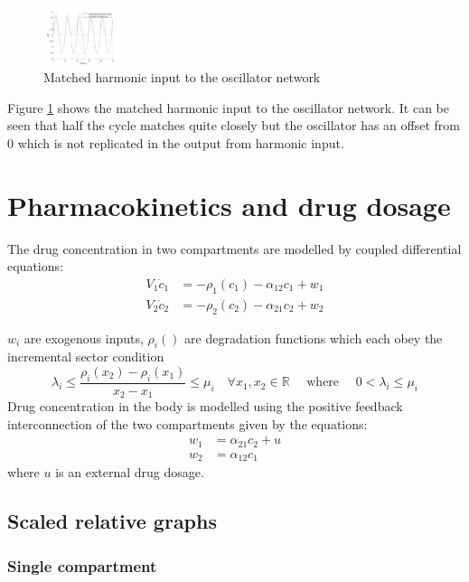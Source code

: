 \documentclass{article}
\begin{document}
\begin{figure}[H]
    \centering
    \includegraphics[width=0.2\textwidth]{figures/15_matched.png}
    \caption{Matched harmonic input to the oscillator network}  
    \label{fig:matched_harmonic_input}
\end{figure}

Figure \ref{fig:matched_harmonic_input} shows the matched harmonic input to the oscillator network.
It can be seen that half the cycle matches quite closely but the oscillator has an offset from 0 which is not replicated in the output from harmonic input.


\section{Pharmacokinetics and drug dosage}

The drug concentration in two compartments are modelled by coupled differential equations:
\begin{align}
    V_1 \dot{c}_1 &= - \rho_1(c_1) - \alpha_{12}c_1 + w_1 \\
    V_2 \dot{c}_2 &= - \rho_2(c_2) - \alpha_{21}c_2 + w_2
\end{align}

$w_i$ are exogenous inputs, $\rho_i()$ are degradation functions which each obey the incremental sector condition
\begin{equation}
    \lambda_i \leq \frac{\rho_i(x_2) - \rho_i(x_1)}{x_2 - x_1} \leq \mu_i \quad \forall x_1, x_2 \in \mathbb{R} \quad \text{ where } \quad 0 < \lambda_i \leq \mu_i
\end{equation}
Drug concentration in the body is modelled using the positive feedback interconnection of the two compartments given by the equations:
\begin{align}
    w_1 &= \alpha_{21} c_2 + u \\
    w_2 &= \alpha_{12} c_1
\end{align}
where $u$ is an external drug dosage.
\subsection{Scaled relative graphs}

\subsubsection{Single compartment}
\end{document}
